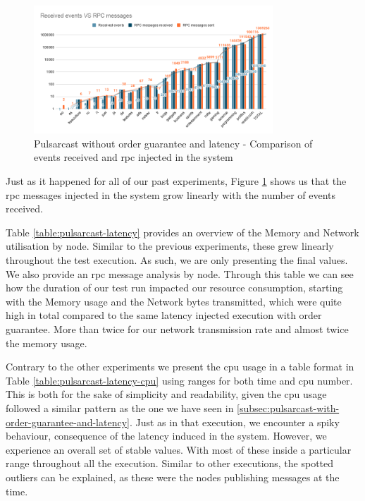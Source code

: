 \begin{figure}[!htb]
  \centering
  \includegraphics[width=0.8\textwidth]{../images/graph-pulsarcast-latency-rpc.png}
  \caption{Pulsarcast without order guarantee and latency - Comparison of events received and \acrshort{rpc} injected in the system}
  \label{fig:graph-pulsarcast-latency-rpc}
\end{figure}

Just as it happened for all of our past experiments, Figure
\ref{fig:graph-pulsarcast-latency-rpc} shows us that the \acrshort{rpc}
messages injected in the system grow linearly with the number of events
received.

Table \ref{table:pulsarcast-latency} provides an overview of the Memory and
Network utilisation by node. Similar to the previous experiments, these grew
linearly throughout the test execution. As such, we are only presenting the
final values. We also provide an \acrshort{rpc} message analysis by node. Through this
table we can see how the duration of our test run impacted our resource
consumption, starting with the Memory usage and the Network bytes transmitted,
which were quite high in total compared to the same latency injected execution
with order guarantee. More than twice for our network transmission rate and
almost twice the memory usage.

Contrary to the other experiments we present the \acrshort{cpu} usage in a
table format in Table \ref{table:pulsarcast-latency-cpu} using ranges for both
time and \acrshort{cpu} number.  This is both for the sake of simplicity and
readability, given the \acrshort{cpu} usage followed a similar pattern as the
one we have seen in \ref{subsec:pulsarcast-with-order-guarantee-and-latency}.
Just as in that execution, we encounter a spiky behaviour, consequence of the
latency induced in the system. However, we experience an overall set of stable
values. With most of these inside a particular range throughout all the
execution. Similar to other executions, the spotted outliers can be explained,
as these were the nodes publishing messages at the time.

